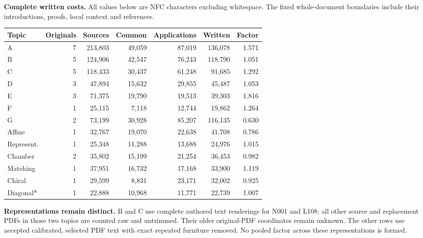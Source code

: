 \documentclass[11pt,a4paper]{article}
\newcommand{\tabsetup}{\small\setlength{\tabcolsep}{4pt}\renewcommand{\arraystretch}{1.12}}
\begin{document}
\textbf{Complete written costs.} All values below are NFC characters excluding whitespace. The fixed whole-document boundaries include their introductions, proofs, local context and references.
\begin{center}\tabsetup\begin{tabular}{lrrrrrr}\toprule
Topic & Originals & Sources & Common & Applications & Written & Factor\\\midrule
A & 7 & 213,803 & 49,059 & 87,019 & 136,078 & 1.571 \\
B & 5 & 124,906 & 42,547 & 76,243 & 118,790 & 1.051 \\
C & 5 & 118,433 & 30,437 & 61,248 & 91,685 & 1.292 \\
D & 3 & 47,894 & 15,632 & 29,855 & 45,487 & 1.053 \\
E & 3 & 71,375 & 19,790 & 19,513 & 39,303 & 1.816 \\
F & 1 & 25,115 & 7,118 & 12,744 & 19,862 & 1.264 \\
G & 2 & 73,199 & 30,928 & 85,207 & 116,135 & 0.630 \\
Affine & 1 & 32,767 & 19,070 & 22,638 & 41,708 & 0.786 \\
Represent. & 1 & 25,348 & 11,288 & 13,688 & 24,976 & 1.015 \\
Chamber & 2 & 35,802 & 15,199 & 21,254 & 36,453 & 0.982 \\
Matching & 1 & 37,951 & 16,732 & 17,168 & 33,900 & 1.119 \\
Chiral & 1 & 29,599 & 8,831 & 23,171 & 32,002 & 0.925 \\
Diagonal* & 1 & 22,888 & 10,968 & 11,771 & 22,739 & 1.007 \\
\bottomrule\end{tabular}\end{center}
\textbf{Representations remain distinct.} B and C use complete authored text renderings for N001 and L108; all other source and replacement PDFs in those two topics are counted raw and untrimmed. Their older original-PDF coordinates remain unknown. The other rows use accepted calibrated, selected PDF text with exact repeated furniture removed. No pooled factor across these representations is formed.
\end{document}

